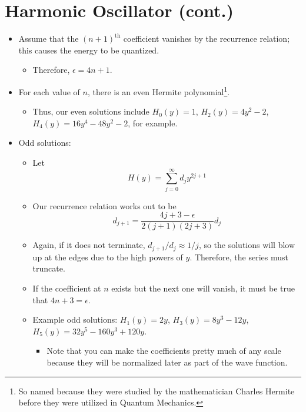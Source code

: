 \documentclass[../notes.tex]{subfiles}
\begin{document}
\section{Harmonic Oscillator (cont.)}
\begin{itemize}
    \item {}Assume that the $(n+1)^\text{th}$ coefficient vanishes by the recurrence relation; this causes the energy to be quantized.
    \begin{itemize}
        \item Therefore, $\epsilon=4n+1$.
    \end{itemize}
    \item For each value of $n$, there is an even Hermite polynomial\footnote{So named because they were studied by the mathematician Charles Hermite before they were utilized in Quantum Mechanics.}.
    \begin{itemize}
        \item Thus, our even solutions include $H_0(y)=1$, $H_2(y)=4y^2-2$, $H_4(y)=16y^4-48y^2-2$, for example.
    \end{itemize}
    \item Odd solutions:
    \begin{itemize}
        \item Let
        \begin{equation*}
            H(y) = \sum_{j=0}^\infty d_jy^{2j+1}
        \end{equation*}
        \item Our recurrence relation works out to be
        \begin{equation*}
            d_{j+1} = \frac{4j+3-\epsilon}{2(j+1)(2j+3)}d_j
        \end{equation*}
        \item Again, if it does not terminate, $d_{j+1}/d_j\approx 1/j$, so the solutions will blow up at the edges due to the high powers of $y$. Therefore, the series must truncate.
        \item If the coefficient at $n$ exists but the next one will vanish, it must be true that $4n+3=\epsilon$.
        \item Example odd solutions: $H_1(y)=2y$, $H_3(y)=8y^3-12y$, $H_5(y)=32y^5-160y^3+120y$.
        \begin{itemize}
            \item Note that you can make the coefficients pretty much of any scale because they will be normalized later as part of the wave function.
        \end{itemize}

\end{itemize}
\end{itemize}
\end{document}
